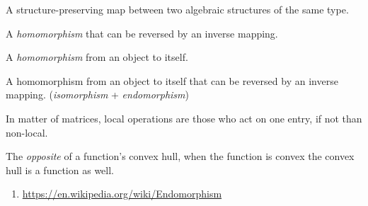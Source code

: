 





\begin{multicols}{3}
  A structure-preserving map between two algebraic structures of the same type.

  A \textit{homomorphism} that can be reversed by an inverse mapping.

  A \textit{homomorphism} from an object to itself.

  A homomorphism from an object to itself that can be reversed by an inverse mapping.
  (\textit{isomorphism} + \textit{endomorphism})

  In matter of matrices, local operations are those who act on one entry, if not than non-local.

  The \textit{opposite} of a function's convex hull, when the function is convex the convex hull is a function as well.

\end{multicols}


\begin{enumerate}
\item \url{https://en.wikipedia.org/wiki/Endomorphism}
\end{enumerate}



